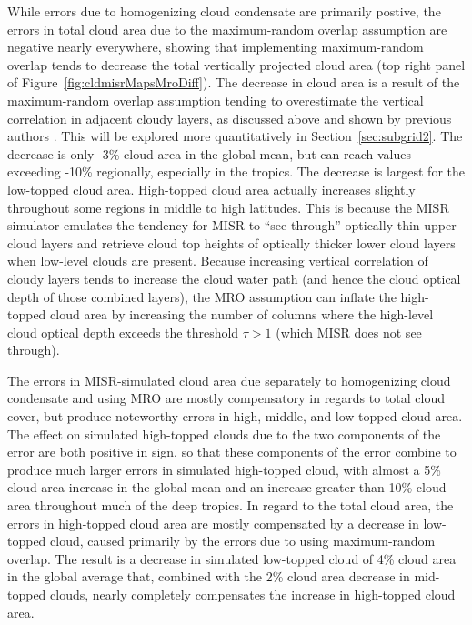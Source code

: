 While errors due to homogenizing cloud condensate are primarily postive,
the errors in total cloud area due to the maximum-random overlap
assumption are negative nearly everywhere, showing that implementing
maximum-random overlap tends to decrease the total vertically projected
cloud area (top right panel of Figure~\ref{fig:cldmisrMapsMroDiff}). The
decrease in cloud area is a result of the maximum-random overlap
assumption tending to overestimate the vertical correlation in adjacent
cloudy layers, as discussed above and shown by previous authors
\citep{mace_and_benson-troth_2002, hogan_and_illingworth_2000, barker_2008}.
This will be explored more quantitatively in Section~\ref{sec:subgrid2}.
The decrease is only -3\% cloud area in the global mean, but can reach
values exceeding -10\% regionally, especially in the tropics. The
decrease is largest for the low-topped cloud area. High-topped cloud
area actually increases slightly throughout some regions in middle to
high latitudes. This is because the MISR simulator emulates the tendency
for MISR to ``see through'' optically thin upper cloud layers and
retrieve cloud top heights of optically thicker lower cloud layers when
low-level clouds are present. Because increasing vertical correlation of
cloudy layers tends to increase the cloud water path (and hence the
cloud optical depth of those combined layers), the MRO assumption can
inflate the high-topped cloud area by increasing the number of columns
where the high-level cloud optical depth exceeds the threshold
\(\tau > 1\) (which MISR does not see through).

The errors in MISR-simulated cloud area due separately to homogenizing
cloud condensate and using MRO are mostly compensatory in regards to
total cloud cover, but produce noteworthy errors in high, middle, and
low-topped cloud area. The effect on simulated high-topped clouds due to
the two components of the error are both positive in sign, so that these
components of the error combine to produce much larger errors in
simulated high-topped cloud, with almost a 5\% cloud area increase in
the global mean and an increase greater than 10\% cloud area throughout
much of the deep tropics. In regard to the total cloud area, the errors
in high-topped cloud area are mostly compensated by a decrease in
low-topped cloud, caused primarily by the errors due to using
maximum-random overlap. The result is a decrease in simulated low-topped
cloud of 4\% cloud area in the global average that, combined with the
2\% cloud area decrease in mid-topped clouds, nearly completely
compensates the increase in high-topped cloud area.

